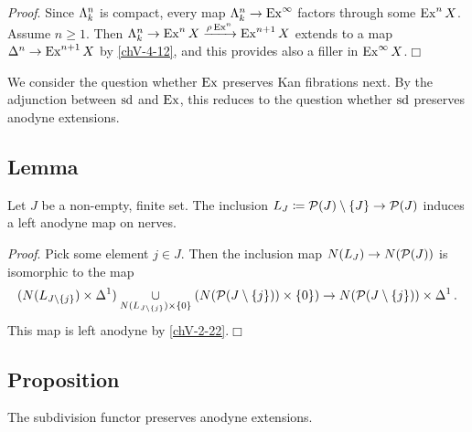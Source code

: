         \emph{Proof}. Since $\Lambda^{n}_{k}$ is compact, every map $\Lambda^{n}_{k} \to \operatorname{Ex}^{\infty}$ factors through some $\operatorname{Ex}^n X$. Assume $n \geq 1$. Then $\Lambda^{n}_{k} \to \operatorname{Ex}^n X \xrightarrow{\rho \operatorname{Ex}^n} \operatorname{Ex}^{n+1} X$ extends to a map $\Delta^n \to \operatorname{Ex}^{n+1} X$ by \ref{chV-4-12}, and this provides also a filler in $\operatorname{Ex}^{\infty} X$.\hfill$\Box$
        \medskip

        We consider the question whether $\operatorname{Ex}$ preserves Kan fibrations next. By the adjunction between $\operatorname{sd}$ and $\operatorname{Ex}$, this reduces to the question whether $\operatorname{sd}$ preserves anodyne extensions.

    \subsection{Lemma}\label{chV-4-14}
        Let $J$ be a non-empty, finite set. The inclusion $L_J \coloneq \mathcal{P}(J) \setminus \{J\} \to \mathcal{P}(J)$ induces a left anodyne map on nerves.
        \smallskip

        \emph{Proof}. Pick some element $j \in J$. Then the inclusion map $N(L_J) \to N(\mathcal{P}(J))$ is isomorphic to the map
        \begin{equation*}
            (N(L_{J \setminus \{j\}}) \times \Delta^1) \underset{N(L_{J \setminus \{j\}}) \times \{0\}}{\cup} (N(\mathcal{P}(J \setminus \{j\})) \times \{0\}) \rightarrow N(\mathcal{P}(J \setminus \{j\})) \times \Delta^1 \,.
        \end{equation*}
        This map is left anodyne by \ref{chV-2-22}.\hfill$\Box$

    \subsection{Proposition}\label{chV-4-15}
        The subdivision functor preserves anodyne extensions.
        \smallskip

